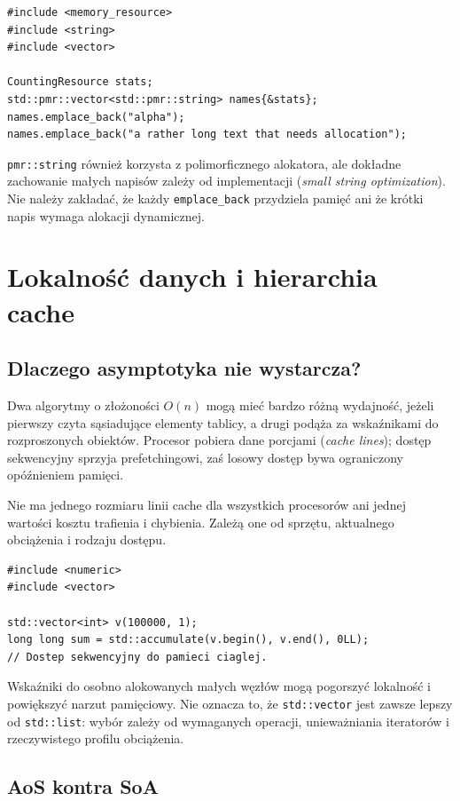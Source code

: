 \begin{lstlisting}
#include <memory_resource>
#include <string>
#include <vector>

CountingResource stats;
std::pmr::vector<std::pmr::string> names{&stats};
names.emplace_back("alpha");
names.emplace_back("a rather long text that needs allocation");
\end{lstlisting}

\texttt{pmr::string} również korzysta z polimorficznego alokatora,
ale dokładne zachowanie małych napisów zależy od implementacji
(\emph{small string optimization}). Nie należy zakładać, że każdy
\texttt{emplace\_back} przydziela pamięć ani że krótki napis wymaga
alokacji dynamicznej.

\section{Lokalność danych i hierarchia cache}
\label{sec:cpp10-cache}

\subsection{Dlaczego asymptotyka nie wystarcza?}

Dwa algorytmy o złożoności \(O(n)\) mogą mieć bardzo różną wydajność,
jeżeli pierwszy czyta sąsiadujące elementy tablicy, a drugi podąża
za wskaźnikami do rozproszonych obiektów. Procesor pobiera dane
porcjami (\emph{cache lines}); dostęp sekwencyjny sprzyja
prefetchingowi, zaś losowy dostęp bywa ograniczony opóźnieniem pamięci.

Nie ma jednego rozmiaru linii cache dla wszystkich procesorów ani
jednej wartości kosztu trafienia i chybienia. Zależą one od sprzętu,
aktualnego obciążenia i rodzaju dostępu.

\begin{lstlisting}
#include <numeric>
#include <vector>

std::vector<int> v(100000, 1);
long long sum = std::accumulate(v.begin(), v.end(), 0LL);
// Dostep sekwencyjny do pamieci ciaglej.
\end{lstlisting}

Wskaźniki do osobno alokowanych małych węzłów mogą pogorszyć
lokalność i powiększyć narzut pamięciowy. Nie oznacza to,
że \texttt{std::vector} jest zawsze lepszy od \texttt{std::list}:
wybór zależy od wymaganych operacji, unieważniania iteratorów
i rzeczywistego profilu obciążenia.

\subsection{AoS kontra SoA}

